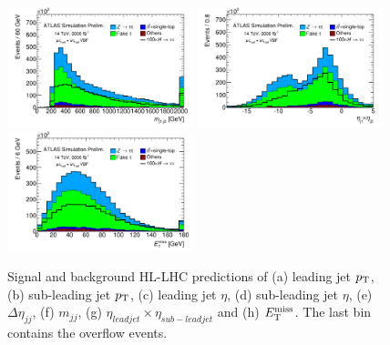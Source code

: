 \begin{figure}[!htpb]
  \includegraphics[width=0.48\textwidth]{figures/ATL-PHYS-PUB-2014-018/fig_03f}
  \includegraphics[width=0.48\textwidth]{figures/ATL-PHYS-PUB-2014-018/fig_03g}
  \includegraphics[width=0.48\textwidth]{figures/ATL-PHYS-PUB-2014-018/fig_03h}
  \caption{Signal and background HL-LHC predictions of (a) leading jet $p_{\mathrm{T}}$, (b) sub-leading jet $p_{\mathrm{T}}$, (c) leading jet $\eta$, (d) sub-leading jet $\eta$, (e) $\Delta\eta_{jj}$, (f) $m_{jj}$, (g) $\eta_{lead jet}\times \eta_{sub-lead jet}$ and (h) $E_{\mathrm{T}}^{\mathrm{miss}}$. The last bin contains the overflow events.}
  \label{fig:prospects-hllhc-jets}
\end{figure}

